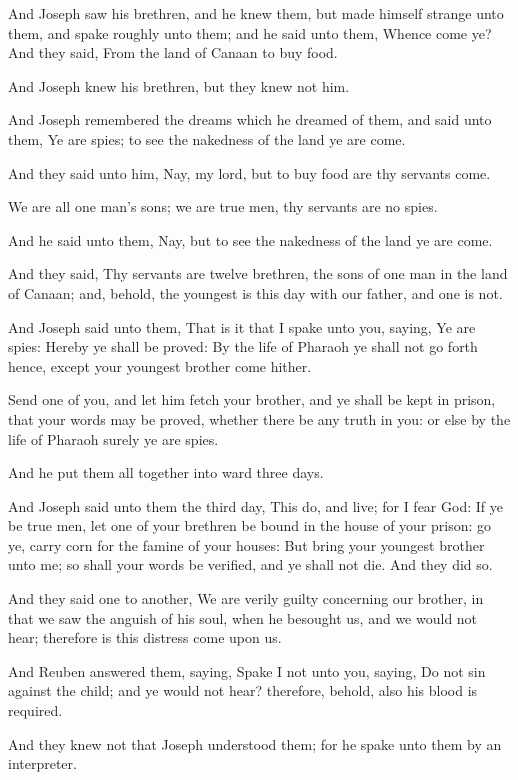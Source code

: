 \Verse And Joseph saw his brethren, and he knew them, but made himself strange unto them, and spake roughly unto them; and he said unto them, Whence come ye? And they said, From the land of Canaan to buy food.

\Verse And Joseph knew his brethren, but they knew not him.

\Verse And Joseph remembered the dreams which he dreamed of them, and said unto them, Ye are spies; to see the nakedness of the land ye are come.

\Verse And they said unto him, Nay, my lord, but to buy food are thy servants come.

\Verse We are all one man's sons; we are true men, thy servants are no spies.

\Verse And he said unto them, Nay, but to see the nakedness of the land ye are come.

\Verse And they said, Thy servants are twelve brethren, the sons of one man in the land of Canaan; and, behold, the youngest is this day with our father, and one is not.

\Verse And Joseph said unto them, That is it that I spake unto you, saying, Ye are spies: \Verse Hereby ye shall be proved: By the life of Pharaoh ye shall not go forth hence, except your youngest brother come hither.

\Verse Send one of you, and let him fetch your brother, and ye shall be kept in prison, that your words may be proved, whether there be any truth in you: or else by the life of Pharaoh surely ye are spies.

\Verse And he put them all together into ward three days.

\Verse And Joseph said unto them the third day, This do, and live; for I fear God: \Verse If ye be true men, let one of your brethren be bound in the house of your prison: go ye, carry corn for the famine of your houses: \Verse But bring your youngest brother unto me; so shall your words be verified, and ye shall not die. And they did so.

\Verse And they said one to another, We are verily guilty concerning our brother, in that we saw the anguish of his soul, when he besought us, and we would not hear; therefore is this distress come upon us.

\Verse And Reuben answered them, saying, Spake I not unto you, saying, Do not sin against the child; and ye would not hear? therefore, behold, also his blood is required.

\Verse And they knew not that Joseph understood them; for he spake unto them by an interpreter.


